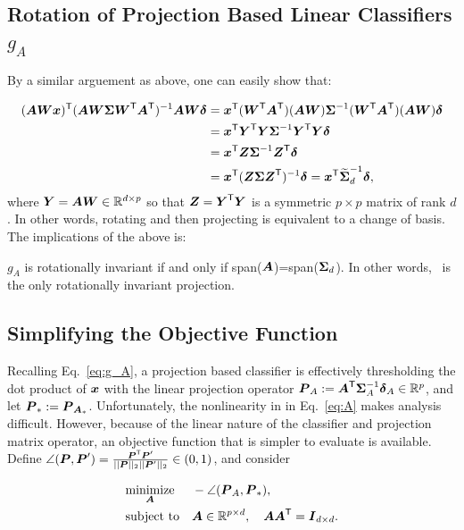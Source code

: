 \documentclass[10pt]{article}
\begin{document}
\subsection[]{Rotation of Projection Based Linear Classifiers $g_A$}

By a similar arguement as above, one can easily show that:

\begin{align*}
(\bA  \bW \bx) \T  (\bA \bW  \bSig  \bW\T \bA\T)^{-1} \bA \bW \bdel
&= \bx\T (\bW\T \bA\T) (\bA \bW) \bSig^{-1} (\bW\T \bA\T) (\bA \bW) \bdel \\
&= \bx\T \bY\T \bY \bSig^{-1} \bY\T \bY \bdel \\
&= \bx\T \bZ \bSig^{-1} \bZ\T \bdel \\
&= \bx\T (\bZ \bSig \bZ\T)^{-1} \bdel = \bx\T \mt{\bSig}_d^{-1} \bdel,
\end{align*}
where $\bY = \bA \bW \in \Real^{d \times p}$ so that $\bZ=\bY\T \bY$ is a symmetric ${p \times p}$ matrix of rank $d$.  In other words, rotating and then projecting is equivalent to a change of basis.
The implications of the above is:
\begin{lem}
$g_A$ is rotationally invariant if and only if span($\bA$)=span($\bSig_d$).
In other words, \Pca~is the only rotationally invariant projection.
\end{lem}





\subsection{Simplifying the Objective Function}

Recalling Eq.~\eqref{eq:g_A}, a projection based classifier is effectively thresholding the dot product of $\bx$ with the linear projection operator $\bP_A :=\bA\T \bSig_A^{-1} \bdel_A \in \Real^p$, and let $\bP_*:=\bP_{\bA_*}$.  Unfortunately, the nonlinearity in in Eq.~\eqref{eq:A} makes analysis difficult.
However, because of the linear nature of the classifier and projection matrix operator, an objective function that is simpler to evaluate is available.
Define
$\angle(\bP,\bP') = \frac{ \bP\T \bP'}{||\bP||_2 ||\bP'||_2} \in (0,1)$, and consider

\begin{equation} \label{eq:angle}
\begin{aligned}
& \underset{\bA}{\text{minimize}}
& & -\angle(\bP_A,\bP_*),
\\ & \text{subject to} & & \bA \in \Real^{p \times d}, \quad \bA \bA\T = \bI_{d \times d}.
\end{aligned}
\end{equation}
\end{document}
